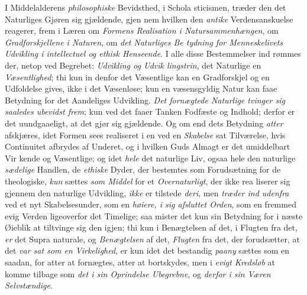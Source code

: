 I Middelalderens \emph{philosophiske} Bevidsthed, i Schola\-%
sticismen, træder den det Naturliges Gjøren sig gjældende, gjen\-%
nem hvilken den \emph{antike} Verdensanskuelse reagerer, frem i Læren
om \emph{Formens Realisation i Natursammenhængen}, om
\emph{Gradforskjellene i Naturen}, om \emph{det Naturliges Be\-%
tydning for Menneskelivets Udvikling i intellectuel
og ethisk Henseende}. I alle disse Bestemmelser ind\-%
rømmes der, netop ved Begrebet: \emph{Udvikling og Udvik\-%
lingstrin}, det Naturlige en \emph{Væsentlighed}; thi kun in\-%
denfor det Væsentlige kan en Gradforskjel og en Udfoldelse
gives, ikke i det Væsenløse; kun en væsensgyldig Natur kan
faae Betydning for det Aandeliges Udvikling. \emph{Det fornægtede
Naturlige tvinger sig saaledes ubevidst frem}; kun
ved det faaer Tanken Fodfæste og Indhold; derfor er det
uundgaaeligt, at det gjør sig gjældende. Og om end dets
Betydning \emph{atter} afskjæres, idet Formen sees realiseret i en
ved en \emph{Skabelse} sat Tilværelse, hvis Continuitet afbrydes af
Underet, og i hvilken Guds Almagt er det umiddelbart Vir\-%
kende og Væsentlige; og idet \emph{hele} det naturlige Liv, ogsaa
hele den naturlige \emph{sædelige} Handlen, de \emph{ethiske} Dyder,
der bestemtes som Forudsætning for de theologiske, \emph{kun}
sættes \emph{som Middel} for et \emph{Overnaturligt}, der ikke rea\-%
liserer sig gjennem den naturlige Udvikling, \emph{ikke} er tilstede
\emph{deri}, men \emph{træder ind udenfra} ved et nyt Skabelsesunder,
som en \emph{høiere, i sig afsluttet Orden}, som en fremmed
evig Verden ligeoverfor det Timelige; saa mister det kun sin
Betydning for i næste Øieblik at tiltvinge sig den igjen; thi
kun i Benægtelsen af det, i Flugten fra det, \emph{er} det Supra\-%
naturale, og \emph{Benægtelsen} af det, \emph{Flugten} fra det, der
forudsætter, at det \emph{var sat som en Virkelighed}, er kun
idet det bestandig \emph{paany} sættes som en saadan, for atter at
fornægtes, atter at bortskydes, men i \emph{evigt Kredsløb} at
komme tilbage som \emph{det i sin Oprindelse Ubegrebne}, og
\emph{derfor i sin Væren Selvstændige}.

